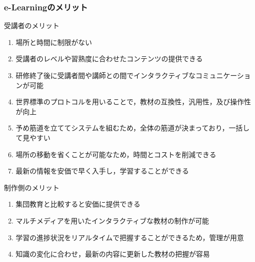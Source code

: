 \documentclass[a4j,12pt]{jsarticle}
\begin{document}
\subsubsection{e-Learningのメリット}
\begin{large}受講者のメリット\end{large}
\begin{enumerate}
\item 場所と時間に制限がない
\item 受講者のレベルや習熟度に合わせたコンテンツの提供できる
\item 研修終了後に受講者間や講師との間でインタラクティブなコミュニケーションが可能
\item 世界標準のプロトコルを用いることで，教材の互換性，汎用性，及び操作性が向上
\item 予め筋道を立ててシステムを組むため，全体の筋道が決まっており，一括して見やすい
\item 場所の移動を省くことが可能なため，時間とコストを削減できる
\item 最新の情報を安価で早く入手し，学習することができる
\end{enumerate}

\begin{large}制作側のメリット\end{large}
\begin{enumerate}
\item 集団教育と比較すると安価に提供できる
\item マルチメディアを用いたインタラクティブな教材の制作が可能
\item 学習の進捗状況をリアルタイムで把握することができるため，管理が用意
\item 知識の変化に合わせ，最新の内容に更新した教材の把握が容易
\end{enumerate}
\end{document}
